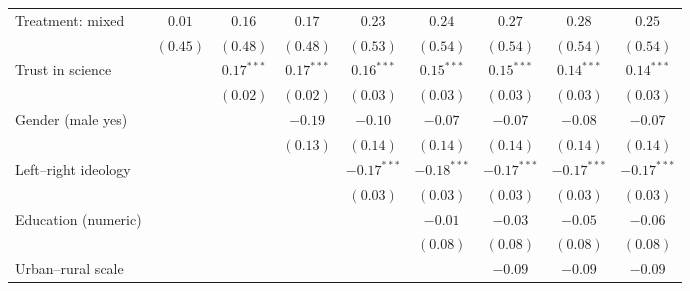 \begin{table}[h]
\begin{center}
\begin{tabular}{l c c c c c c c c}
Treatment: mixed                                                                & $0.01$       & $0.16$       & $0.17$       & $0.23$        & $0.24$        & $0.27$        & $0.28$        & $0.25$        \\
                                                                                & $(0.45)$     & $(0.48)$     & $(0.48)$     & $(0.53)$      & $(0.54)$      & $(0.54)$      & $(0.54)$      & $(0.54)$      \\
Trust in science                                                                &              & $0.17^{***}$ & $0.17^{***}$ & $0.16^{***}$  & $0.15^{***}$  & $0.15^{***}$  & $0.14^{***}$  & $0.14^{***}$  \\
                                                                                &              & $(0.02)$     & $(0.02)$     & $(0.03)$      & $(0.03)$      & $(0.03)$      & $(0.03)$      & $(0.03)$      \\
Gender (male yes)                                                               &              &              & $-0.19$      & $-0.10$       & $-0.07$       & $-0.07$       & $-0.08$       & $-0.07$       \\
                                                                                &              &              & $(0.13)$     & $(0.14)$      & $(0.14)$      & $(0.14)$      & $(0.14)$      & $(0.14)$      \\
Left–right ideology                                                             &              &              &              & $-0.17^{***}$ & $-0.18^{***}$ & $-0.17^{***}$ & $-0.17^{***}$ & $-0.17^{***}$ \\
                                                                                &              &              &              & $(0.03)$      & $(0.03)$      & $(0.03)$      & $(0.03)$      & $(0.03)$      \\
Education (numeric)                                                             &              &              &              &               & $-0.01$       & $-0.03$       & $-0.05$       & $-0.06$       \\
                                                                                &              &              &              &               & $(0.08)$      & $(0.08)$      & $(0.08)$      & $(0.08)$      \\
Urban–rural scale                                                               &              &              &              &               &               & $-0.09$       & $-0.09$       & $-0.09$       \\

\end{tabular}
\end{center}
\end{table}
